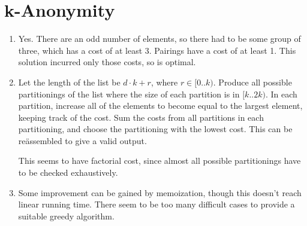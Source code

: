 \documentclass[11pt]{article}
\begin{document}
\section{k-Anonymity}
\begin{enumerate}
\item Yes. There are an odd number of elements, so there had to be some group of three, which has a cost of at least 3. Pairings have a cost of at least 1. This solution incurred only those costs, so is optimal.
\item Let the length of the list be \(d\cdot k+r\), where \(r\in[0..k)\). Produce all possible partitionings of the list where the size of each partition is in \([k..2k)\). In each partition, increase all of the elements to become equal to the largest element, keeping track of the cost. Sum the costs from all partitions in each partitioning, and choose the partitioning with the lowest cost. This can be re\"assembled to give a valid output.

  This seems to have factorial cost, since almost all possible partitionings have to be checked exhaustively.
\item Some improvement can be gained by memoization, though this doesn't reach linear running time. There seem to be too many difficult cases to provide a suitable greedy algorithm.
\end{enumerate}
\end{document}
